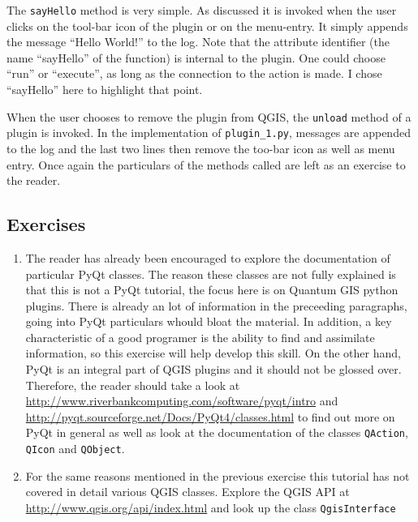 \par%
The \lstinline{sayHello} method is very simple. As discussed it is invoked when the user clicks on the tool-bar icon of the plugin or on the menu-entry. It simply appends the message ``Hello World!'' to the log.  Note that the attribute identifier (the name ``sayHello'' of the function) is internal to the plugin. One could choose ``run'' or ``execute'', as long as the connection to the action is made. I chose ``sayHello'' here to highlight that point.
\par%
When the user chooses to remove the plugin from QGIS, the \lstinline{unload} method of a plugin is invoked. In the implementation of \lstinline{plugin_1.py}, messages are appended to the log and the last two lines then remove the too-bar icon as well as menu entry. Once again the particulars of the methods called are left as an exercise to the reader.

\subsection{Exercises}
\label{ssect:plugin_1_exercises}
\begin{enumerate}
\item The reader has already been encouraged to explore the documentation of particular PyQt classes. The reason these classes are not fully explained is that this is not a PyQt tutorial, the focus here is on Quantum GIS python plugins. There is already an lot of information in the preceeding paragraphs, going into PyQt particulars whould bloat the material. In addition, a key characteristic of a good programer is the ability to find and assimilate information, so this exercise will help develop this skill. On the other hand, PyQt is an integral part of QGIS plugins and it should not be glossed over. Therefore, the reader should take a look at \url{http://www.riverbankcomputing.com/software/pyqt/intro} and \url{http://pyqt.sourceforge.net/Docs/PyQt4/classes.html} to find out more on PyQt in general as well as look at the documentation of the classes \lstinline{QAction}, \lstinline{QIcon} and \lstinline{QObject}.
\item For the same reasons mentioned in the previous exercise this tutorial has not covered in detail various QGIS classes. Explore the QGIS API at \url{http://www.qgis.org/api/index.html} and look up the class \lstinline{QgisInterface}
\end{enumerate}
